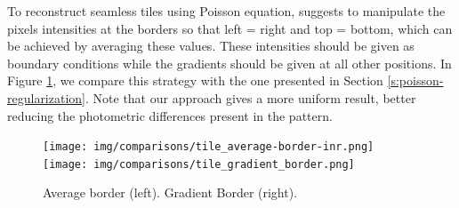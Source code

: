 
To reconstruct seamless tiles using Poisson equation, \citet{perez2023poisson} suggests to manipulate the pixels intensities at the borders so that left = right and top = bottom, which can be achieved by averaging these values. These intensities should be given as boundary conditions while the gradients should be given at all other positions. In Figure \ref{f:average_border},  we compare this strategy with the one presented in Section \ref{s:poisson-regularization}. Note that our approach gives a more uniform result, better reducing the photometric differences present in the pattern.
\begin{figure}[!h]
\centering
\texttt{[image: img/comparisons/tile\_average-border-inr.png]}
\texttt{[image: img/comparisons/tile\_gradient\_border.png]}
\vspace{-0.3cm}
\caption{Average border (left). Gradient Border (right).}
\label{f:average_border}
\end{figure}






